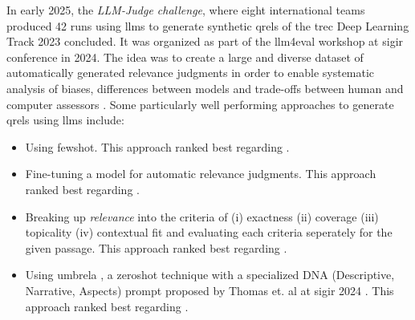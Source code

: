 In early 2025, the \textit{LLM-Judge challenge}, where eight international teams produced 42 runs using \glspl{llm} to generate synthetic \glspl{qrel} of the \gls{trec} Deep Learning Track 2023 concluded. It was organized as part of the \gls{llm4eval} workshop at \gls{sigir} conference in 2024. The idea was to create a large and diverse dataset of automatically generated relevance judgments in order to enable systematic analysis of biases, differences between models and trade-offs between human and computer assessors \cite{judgingthejudges}.
Some particularly well performing approaches to generate \glspl{qrel} using \glspl{llm} include:
\begin{itemize}
  \item Using \gls{fewshot}. This approach ranked best regarding .
  \item Fine-tuning a model for automatic relevance judgments. This approach ranked best regarding .
  \item Breaking up \textit{relevance} into the criteria of (i) exactness (ii) coverage (iii) topicality (iv) contextual fit and evaluating each criteria seperately for the given passage. This approach ranked best regarding .
  \item Using \gls{umbrela} \cite{umbrela}, a \gls{zeroshot} technique with a specialized DNA (Descriptive, Narrative, Aspects) prompt proposed by Thomas et. al at \gls{sigir} 2024 \cite{thomas2024}. This approach ranked best regarding .
\end{itemize}



